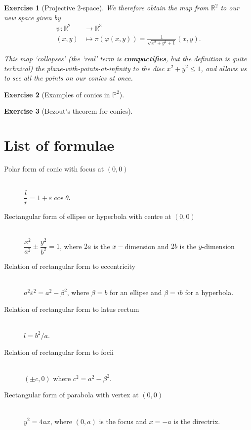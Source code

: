 \documentclass[a4paper,leqno,10pt]{article}
\theoremstyle{exercise}
\newtheorem{Exercise}{Exercise}
\newenvironment{exercise}
  {\begin{mdframed}\begin{Exercise}}
  {\end{Exercise}\end{mdframed}}
\theoremstyle{plain}
\theoremstyle{definition}
\theoremstyle{remark}
\newcommand{\df}{\textbf}
\begin{document}
\begin{exercise}[Projective 2-space]
  We therefore obtain the map from $ \mathbb{R}^2 $ to our new space given by
  \begin{align*}
    \psi : \mathbb{R}^2 &\to \mathbb{R}^3\\
    (x,y) &\mapsto \pi(\varphi(x,y)) = \frac{1}{\sqrt{x^2 + y^2 + 1}} (x,y).
  \end{align*}

  This map `collapses' (the `real' term is \df{compactifies}, but the definition is quite technical) the plane-with-points-at-infinity
  to the disc $ x^2 + y^2 \leq 1 $, and allows us to see all the points on our conics at once.
\end{exercise}

\begin{exercise}[Examples of conics in $ \mathbb{P}^2 $]
\end{exercise}

\begin{exercise}[Bezout's theorem for conics]
\end{exercise}

\appendix
{}[{\titlerule[0.8pt]}]
\section{List of formulae}

\begin{description}
  \item[Polar form of conic with focus at $ (0,0) $] \hfill \\
    $\dfrac{l}{r} = 1 + \varepsilon \cos \theta $.
  \item[Rectangular form of ellipse or hyperbola with centre at $ (0,0) $] \hfill \\
    $ \dfrac{x^2}{a^2} \pm \dfrac{y^2}{b^2} = 1 $, where $ 2a $ is the $ x-$dimension and $ 2b $ is the $ y$-dimension
  \item[Relation of rectangular form to eccentricity] \hfill \\
    $ a^2 \varepsilon^2 = a^2 - \beta^2 $,  where $ \beta = b $ for an ellipse and $ \beta = ib $ for a hyperbola.
  \item[Relation of rectangular form to latus rectum] \hfill \\
    $ l = b^2/a $.
  \item[Relation of rectangular form to focii] \hfill \\
    $ (\pm c, 0) $ where $ c^2 = a^2 - \beta^2 $.
  \item[Rectangular form of parabola with vertex at $ (0,0) $] \hfill \\
    $ y^2 = 4ax $, where $ (0,a) $ is the focus and $ x = -a $ is the directrix.
\end{description}
\end{document}
